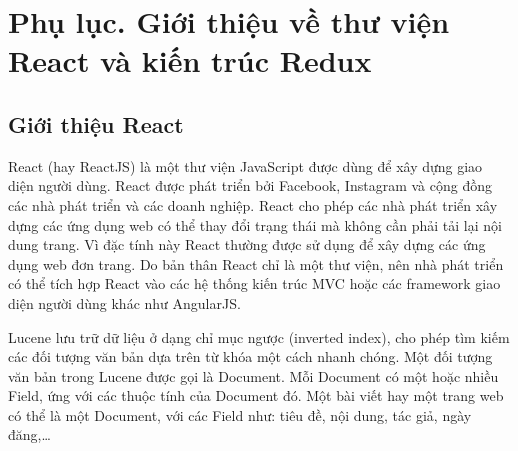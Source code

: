 
\chapter*{Phụ lục. Giới thiệu về thư viện React và kiến trúc Redux}

\section*{Giới thiệu React}
React (hay ReactJS) là một thư viện JavaScript được dùng để xây dựng giao diện người dùng. React được phát triển bởi Facebook, Instagram và cộng đồng các nhà phát triển và các doanh nghiệp. React cho phép các nhà phát triển xây dựng các ứng dụng web có thể thay đổi trạng thái mà không cần phải tải lại nội dung trang. Vì đặc tính này React thường được sử dụng để xây dựng các ứng dụng web đơn trang. Do bản thân React chỉ là một thư viện, nên nhà phát triển có thể tích hợp React vào các hệ thống kiến trúc MVC hoặc các framework giao diện người dùng khác như AngularJS.



Lucene lưu trữ dữ liệu ở dạng chỉ mục ngược (inverted index), cho phép tìm kiếm các đối tượng văn bản dựa trên từ khóa một cách nhanh chóng. Một đối tượng văn bản trong Lucene được gọi là Document. Mỗi Document có một hoặc nhiều Field, ứng với các thuộc tính của Document đó. Một bài viết hay một trang web có thể là một Document, với các Field như: tiêu đề, nội dung, tác giả, ngày đăng,…

